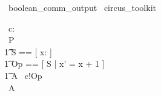 \begin{zsection}
  \SECTION\ boolean\_comm\_output \parents\ circus\_toolkit
\end{zsection}

\begin{circus}
   \circchannel\ c: \boolean \\
   \circprocess\ P \circdef \circbegin \\
    \t1 \circstate S == [ x: \nat ] \\
    \t1 Op == [ \Delta S | x' = x + 1 ] \\
    \t1 A \circdef\ c!Op \then \Skip \\
   \circspot\ A \\
   \circend
\end{circus}
